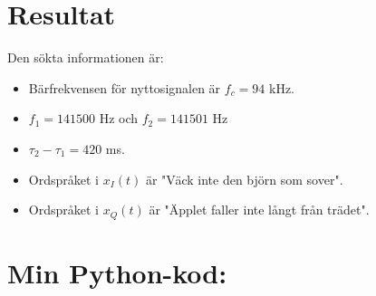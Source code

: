 \documentclass[10pt,twocolumn]{article}
\begin{document}

\section{Resultat}

Den sökta informationen är:
\begin{itemize}
\item Bärfrekvensen för nyttosignalen är $f_c=94$ kHz.
\item $f_1=141500$ Hz och $f_2=141501$ Hz
\item $\tau_2 - \tau_1 = 420$ ms.
\item Ordspråket i $x_I(t)$ är "Väck inte den björn som sover".
\item Ordspråket i $x_Q(t)$ är "Äpplet faller inte långt från trädet".
\end{itemize}

\clearpage

\onecolumn
\section*{Min Python-kod:}

\end{document}
